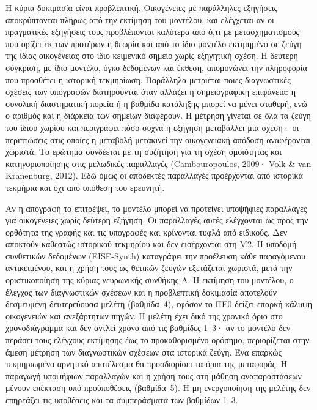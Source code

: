 \documentclass[11pt,a4paper]{article}
\begin{document}
Η κύρια δοκιμασία είναι προβλεπτική. Οικογένειες με παράλληλες εξηγήσεις αποκρύπτονται πλήρως από την εκτίμηση του μοντέλου, και ελέγχεται αν οι πραγματικές εξηγήσεις τους προβλέπονται καλύτερα από ό,τι με μετασχηματισμούς που ορίζει εκ των προτέρων η θεωρία και από το ίδιο μοντέλο εκτιμημένο σε ζεύγη της ίδιας οικογένειας στο ίδιο κειμενικό σημείο χωρίς εξηγητική σχέση. Η δεύτερη σύγκριση, με ίδιο μοντέλο, όγκο δεδομένων και έκθεση, απομονώνει την πληροφορία που προσθέτει η ιστορική τεκμηρίωση. Παράλληλα μετριέται ποιες διαγνωστικές σχέσεις των υπογραφών διατηρούνται όταν αλλάζει η σημειογραφική επιφάνεια: η συνολική διαστηματική πορεία ή η βαθμίδα κατάληξης μπορεί να μένει σταθερή, ενώ ο αριθμός και η διάρκεια των σημείων διαφέρουν. Η μέτρηση γίνεται σε όλα τα ζεύγη του ίδιου χωρίου και περιγράφει πόσο συχνά η εξήγηση μεταβάλλει μια σχέση· οι περιπτώσεις στις οποίες η μεταβολή μετακινεί την οικογενειακή απόδοση αναφέρονται χωριστά. Το ερώτημα συνδέεται με τη συζήτηση για τη σχέση ομοιότητας και κατηγοριοποίησης στις μελωδικές παραλλαγές (Cambouropoulos, 2009· Volk \& van Kranenburg, 2012). Εδώ όμως οι αποδεκτές παραλλαγές προέρχονται από ιστορικά τεκμήρια και όχι από υπόθεση του ερευνητή.

Αν η απογραφή το επιτρέψει, το μοντέλο μπορεί να προτείνει υποψήφιες παραλλαγές για οικογένειες χωρίς δεύτερη εξήγηση. Οι παραλλαγές αυτές ελέγχονται ως προς την ορθότητα της γραφής και τις υπογραφές και κρίνονται τυφλά από ειδικούς. Δεν αποκτούν καθεστώς ιστορικού τεκμηρίου και δεν εισέρχονται στη M2. Η υποδομή συνθετικών δεδομένων (EISE-Synth) καταγράφει την προέλευση κάθε παραγόμενου αντικειμένου, και η χρήση τους ως θετικών ζευγών εξετάζεται χωριστά, μετά την οριστικοποίηση της κύριας νευρωνικής συνθήκης A. Η εκτίμηση του μοντέλου, ο έλεγχος των διαγνωστικών σχέσεων και η προβλεπτική δοκιμασία αποτελούν δεσμευμένη δευτερεύουσα μελέτη (βαθμίδα~4), εφόσον το ΠΕ0 δείξει επαρκή κάλυψη οικογενειών και ανεξάρτητων πηγών. Η μελέτη έχει δικό της χρονικό όριο στο χρονοδιάγραμμα και δεν αντλεί χρόνο από τις βαθμίδες 1--3· αν το μοντέλο δεν περάσει τους ελέγχους εκτίμησης έως το προκαθορισμένο ορόσημο, περιορίζεται στην άμεση μέτρηση των διαγνωστικών σχέσεων στα ιστορικά ζεύγη. Ένα επαρκώς τεκμηριωμένο αρνητικό αποτέλεσμα θα προσδιορίσει τα όρια της μεταφοράς. Η παραγωγή υποψήφιων παραλλαγών και η χρήση τους στη μάθηση αναπαραστάσεων μένουν επέκταση υπό προϋποθέσεις (βαθμίδα~5). Η μη ενεργοποίηση της μελέτης δεν επηρεάζει τις υποθέσεις και τα συμπεράσματα των βαθμίδων 1--3.
\end{document}
